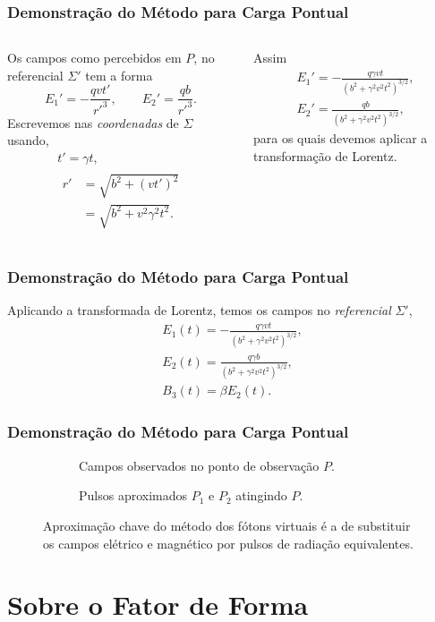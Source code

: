 \documentclass[xcolor=dvipsnames]{beamer}
\begin{document}
\begin{frame}
	\frametitle{Demonstração do Método para Carga Pontual}
	\begin{columns}

		Os campos como percebidos em $P$, no referencial $\Sigma '$ tem a forma
		\begin{equation}
			E_1 ' = -\frac{qvt'}{{r'} ^3}, \qquad E_2 ' = \frac{qb}{{r'}^3}.
		\end{equation}
		Escrevemos nas \textit{coordenadas} de $\Sigma$ usando,
		\begin{gather}
			t' = \gamma t, \\
			\begin{split}
			r ' &= \sqrt{b^2 + (v t')^2} \\
				&= \sqrt{b^2 + v^2 \gamma ^2 t^2}.
			\end{split}
		\end{gather}

		Assim
		\begin{gather}
			E _1 '= - \frac{q\gamma vt}{(b^2 + \gamma ^2 v^2 t^2)^{3/2}},\\
			E _2 '= \frac{qb}{(b^2 + \gamma ^2 v^2 t^2)^{3/2}},
		\end{gather}
		para os quais devemos aplicar a transformação de Lorentz.
	\end{columns}
\end{frame}

\begin{frame}
	\frametitle{Demonstração do Método para Carga Pontual}
	Aplicando a transformada de Lorentz, temos os campos no \textit{referencial}
	$\Sigma '$,
	\begin{gather}
		E_1 (t) = -\frac{q\gamma vt}{(b^2 + \gamma ^2 v^2t^2)^{3/2}}
			\label{eq_field1},\\
		E_2 (t) = \frac{q\gamma b}{(b^2 + \gamma ^2 v^2 t
			^2)^{3/2}}\label{eq_field2},\\ 
		B_3 (t) = \beta E_2(t) \label{eq_field3}.
	\end{gather}
\end{frame}

\begin{frame}
	\frametitle{Demonstração do Método para Carga Pontual}
	\begin{figure}
		\begin{subfigure}[b]{0.4\textwidth}
			\centering
			
			\caption{Campos observados no ponto de observação $P$.}
		\end{subfigure}
		\hspace{1cm}
		\begin{subfigure}[b]{0.4\textwidth}
			\centering
			
			\caption{Pulsos aproximados $P_1$ e $P_2$ atingindo $P$.}
		\end{subfigure}
		\caption{Aproximação chave do método dos fótons virtuais é a de
		substituir os campos elétrico e magnético por pulsos de radiação
		equivalentes.}
	\end{figure}

\end{frame}

\section{Sobre o Fator de Forma}
\end{document}
